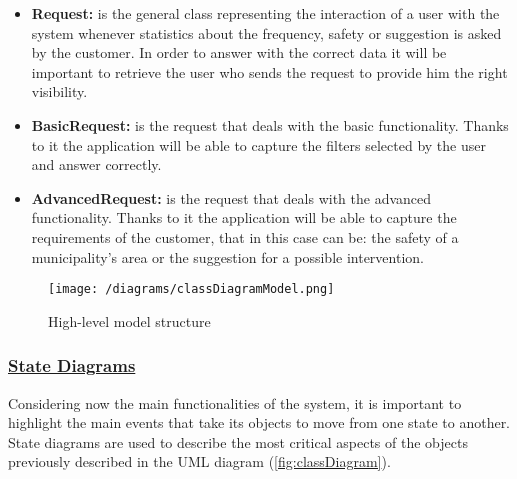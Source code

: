 \begin{itemize}
		\item \textbf{Request:} is the general class representing the interaction of a user with the system whenever statistics about the frequency, safety or suggestion is asked by the customer. In order to answer with the correct data it will be important to retrieve the user who sends the request to provide him the right visibility.
		
		\item \textbf{BasicRequest:} is the request that deals with the basic functionality. Thanks to it the application will be able to capture the filters selected by the user and answer correctly.
		
		\item \textbf{AdvancedRequest:} is the request that deals with the advanced functionality. Thanks to it the application will be able to capture the requirements of the customer, that in this case can be: the safety of a municipality's area or the suggestion for a possible intervention.
	\end{itemize}
	
	\begin{figure}[h!]
		\centering
		\texttt{[image: /diagrams/classDiagramModel.png]}
		\caption{\label{fig:classDiagram}High-level model structure}
	\end{figure}

	\FloatBarrier
	
	\subsubsection[State Diagrams]{\hyperlink{toc}{State Diagrams}}
	Considering now the main functionalities of the system, it is important to highlight the main events that take its objects to move from one state to another. State diagrams are used to describe the most critical aspects of the objects previously described in the UML diagram (\autoref{fig:classDiagram}).
	
